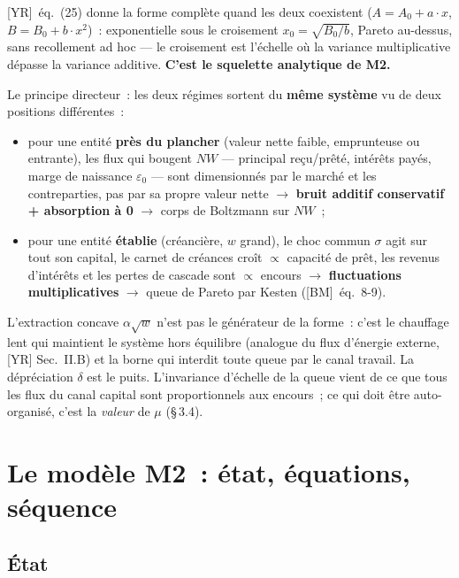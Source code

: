 \documentclass[11pt,a4paper]{article}
\newcommand{\NW}{\mathit{NW}}
\begin{document}
[YR]~éq.~(25) donne la forme complète quand les deux coexistent ($A = A_0 + a\cdot x$, $B = B_0 + b\cdot x^2$)~: exponentielle sous le croisement $x_0 = \sqrt{B_0/b}$, Pareto au-dessus, sans recollement ad hoc --- le croisement est l'échelle où la variance multiplicative dépasse la variance additive. \textbf{C'est le squelette analytique de M2.}

Le principe directeur~: les deux régimes sortent du \textbf{même système} vu de deux positions différentes~:

\begin{itemize}
  \item pour une entité \textbf{près du plancher} (valeur nette faible, emprunteuse ou entrante), les flux qui bougent $\NW$ --- principal reçu/prêté, intérêts payés, marge de naissance $\varepsilon_0$ --- sont dimensionnés par le marché et les contreparties, pas par sa propre valeur nette $\to$ \textbf{bruit additif conservatif + absorption à 0} $\to$ corps de Boltzmann sur $\NW$~;
  \item pour une entité \textbf{établie} (créancière, $w$ grand), le choc commun $\sigma$ agit sur tout son capital, le carnet de créances croît $\propto$ capacité de prêt, les revenus d'intérêts et les pertes de cascade sont $\propto$ encours $\to$ \textbf{fluctuations multiplicatives} $\to$ queue de Pareto par Kesten ([BM]~éq.~8-9).
\end{itemize}

L'extraction concave $\alpha\sqrt{w}$ n'est pas le générateur de la forme~: c'est le chauffage lent qui maintient le système hors équilibre (analogue du flux d'énergie externe, [YR] Sec.~II.B) et la borne qui interdit toute queue par le canal travail. La dépréciation $\delta$ est le puits. L'invariance d'échelle de la queue vient de ce que tous les flux du canal capital sont proportionnels aux encours~; ce qui doit être auto-organisé, c'est la \emph{valeur} de $\mu$ (\S\,3.4).

\section{Le modèle M2~: état, équations, séquence}
\label{sec:modele}

\subsection{État}
\label{sec:etat}
\end{document}

